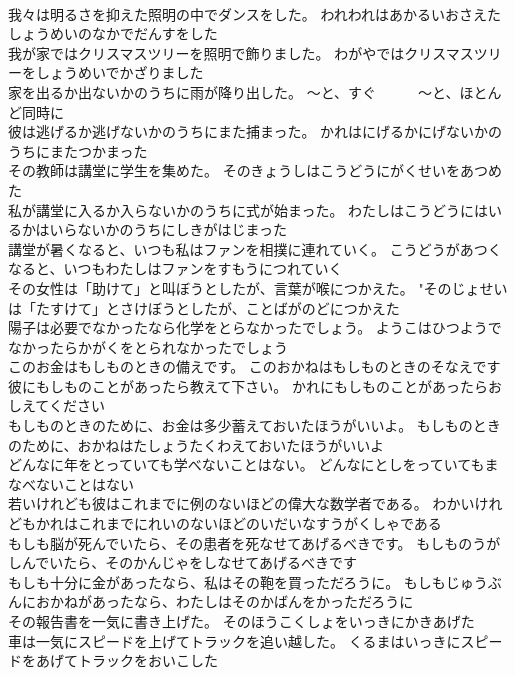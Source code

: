 \documentclass[8pt]{extreport}
\begin{document}
\begin{CJK}{UTF8}{min}
\\	我々は明るさを抑えた照明の中でダンスをした。	われわれはあかるいおさえたしょうめいのなかでだんすをした 
\\	我が家ではクリスマスツリーを照明で飾りました。	わがやではクリスマスツリーをしょうめいでかざりました 
\\	家を出るか出ないかのうちに雨が降り出した。	～と、すぐ　　　～と、ほとんど同時に
\\	彼は逃げるか逃げないかのうちにまた捕まった。	かれはにげるかにげないかのうちにまたつかまった 
\\	その教師は講堂に学生を集めた。	そのきょうしはこうどうにがくせいをあつめた 
\\	私が講堂に入るか入らないかのうちに式が始まった。	わたしはこうどうにはいるかはいらないかのうちにしきがはじまった 
\\	講堂が暑くなると、いつも私はファンを相撲に連れていく。	こうどうがあつくなると、いつもわたしはファンをすもうにつれていく 
\\	その女性は「助けて」と叫ぼうとしたが、言葉が喉につかえた。	"そのじょせいは「たすけて」とさけぼうとしたが、ことばがのどにつかえた 
\\	陽子は必要でなかったなら化学をとらなかったでしょう。	ようこはひつようでなかったらかがくをとられなかったでしょう 
\\	このお金はもしものときの備えです。	このおかねはもしものときのそなえです 
\\	彼にもしものことがあったら教えて下さい。	かれにもしものことがあったらおしえてください 
\\	もしものときのために、お金は多少蓄えておいたほうがいいよ。	もしものときのために、おかねはたしょうたくわえておいたほうがいいよ 
\\	どんなに年をとっていても学べないことはない。	どんなにとしをっていてもまなべないことはない 
\\	若いけれども彼はこれまでに例のないほどの偉大な数学者である。	わかいけれどもかれはこれまでにれいのないほどのいだいなすうがくしゃである 
\\	もしも脳が死んでいたら、その患者を死なせてあげるべきです。	もしものうがしんでいたら、そのかんじゃをしなせてあげるべきです 
\\	もしも十分に金があったなら、私はその鞄を買っただろうに。	もしもじゅうぶんにおかねがあったなら、わたしはそのかばんをかっただろうに 
\\	その報告書を一気に書き上げた。	そのほうこくしょをいっきにかきあげた 
\\	車は一気にスピードを上げてトラックを追い越した。	くるまはいっきにスピードをあげてトラックをおいこした 

\end{CJK}
\end{document}
